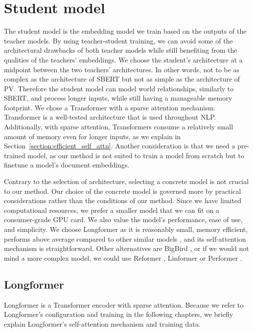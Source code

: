 \section{Student model}\label{section:student_model}

The student model is the embedding model we train based on the outputs of the
teacher models. By using teacher-student training, we can avoid some of the
architectural drawbacks of both teacher models while still benefiting from the
qualities of the teachers' embeddings. We choose the student's architecture at
a midpoint between the two teachers' architectures. In other words, not to be
as complex as the architecture of SBERT but not as simple as the architecture
of PV. Therefore the student model can model world relationships, similarly to
SBERT, and process longer inputs, while still having a manageable memory
footprint. We chose a Transformer with a sparse attention mechanism.
Transformer is a well-tested architecture that is used throughout NLP.
Additionally, with sparse attention, Transformers consume a relatively small
amount of memory even for longer inputs, as we explain in
Section~\ref{section:efficient_self_attn}. Another consideration is that we
need a pre-trained model, as our method is not suited to train a model from
scratch but to finetune a model's document embeddings.

Contrary to the selection of architecture, selecting a concrete model is not
crucial to our method. Our choice of the concrete model is governed more by
practical considerations rather than the conditions of our method. Since we
have limited computational resources, we prefer a smaller model that we can fit
on a consumer-grade GPU card. We also value the model's performance, ease of
use, and simplicity. We choose Longformer \citep{beltagy2020longformer} as it
is reasonably small, memory efficient, performs above average compared to other
similar models \citep{tay2020long}, and its self-attention mechanism is
straightforward. Other alternatives are BigBird \citep{zaheer2020big}, or if we
would not mind a more complex model, we could use Reformer
\citep{kitaev2020reformer}, Linformer \citep{wang2020linformer} or Performer
\citep{choromanski2020rethinking}.

\subsection{Longformer}

Longformer \citep{beltagy2020longformer} is a Transformer encoder with sparse
attention. Because we refer to Longformer's configuration and training in the
following chapters, we briefly explain Longformer's self-attention mechanism
and training data.


